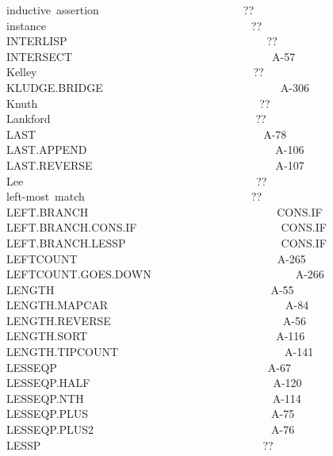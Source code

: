 \documentclass[11pt]{book}
\newenvironment{pubasis}{\begin{flushleft}\ttfamily\small}{\normalsize\rmfamily\end{flushleft}}
\begin{document}
\begin{pubasis}
inductive~assertion~~~~~~~~~~~~~~~~~~~~~~~~~~??\\
instance~~~~~~~~~~~~~~~~~~~~~~~~~~~~~~~~~~~~~??\\
INTERLISP~~~~~~~~~~~~~~~~~~~~~~~~~~~~~~~~~~~~??\\
INTERSECT~~~~~~~~~~~~~~~~~~~~~~~~~~~~~~~~~~~~A-57\\
Kelley~~~~~~~~~~~~~~~~~~~~~~~~~~~~~~~~~~~~~~~??\\
KLUDGE.BRIDGE~~~~~~~~~~~~~~~~~~~~~~~~~~~~~~~~A-306\\
Knuth~~~~~~~~~~~~~~~~~~~~~~~~~~~~~~~~~~~~~~~~??\\
Lankford~~~~~~~~~~~~~~~~~~~~~~~~~~~~~~~~~~~~~??\\
LAST~~~~~~~~~~~~~~~~~~~~~~~~~~~~~~~~~~~~~~~~~A-78\\
LAST.APPEND~~~~~~~~~~~~~~~~~~~~~~~~~~~~~~~~~~A-106\\
LAST.REVERSE~~~~~~~~~~~~~~~~~~~~~~~~~~~~~~~~~A-107\\
Lee~~~~~~~~~~~~~~~~~~~~~~~~~~~~~~~~~~~~~~~~~~??\\
left-most~match~~~~~~~~~~~~~~~~~~~~~~~~~~~~~~??\\
LEFT.BRANCH~~~~~~~~~~~~~~~~~~~~~~~~~~~~~~~~~~CONS.IF\\
LEFT.BRANCH.CONS.IF~~~~~~~~~~~~~~~~~~~~~~~~~~CONS.IF\\
LEFT.BRANCH.LESSP~~~~~~~~~~~~~~~~~~~~~~~~~~~~CONS.IF\\
LEFTCOUNT~~~~~~~~~~~~~~~~~~~~~~~~~~~~~~~~~~~~A-265\\
LEFT\-COUNT.GOES.DOWN~~~~~~~~~~~~~~~~~~~~~~~~~~A-266\\
LENGTH~~~~~~~~~~~~~~~~~~~~~~~~~~~~~~~~~~~~~~~A-55\\
LENGTH.MAPCAR~~~~~~~~~~~~~~~~~~~~~~~~~~~~~~~~A-84\\
LENGTH.REVERSE~~~~~~~~~~~~~~~~~~~~~~~~~~~~~~~A-56\\
LENGTH.SORT~~~~~~~~~~~~~~~~~~~~~~~~~~~~~~~~~~A-116\\
LENGTH.TIPCOUNT~~~~~~~~~~~~~~~~~~~~~~~~~~~~~~A-141\\
LESSEQP~~~~~~~~~~~~~~~~~~~~~~~~~~~~~~~~~~~~~~A-67\\
LESSEQP.HALF~~~~~~~~~~~~~~~~~~~~~~~~~~~~~~~~~A-120\\
LESSEQP.NTH~~~~~~~~~~~~~~~~~~~~~~~~~~~~~~~~~~A-114\\
LESSEQP.PLUS~~~~~~~~~~~~~~~~~~~~~~~~~~~~~~~~~A-75\\
LESSEQP.PLUS2~~~~~~~~~~~~~~~~~~~~~~~~~~~~~~~~A-76\\
LESSP~~~~~~~~~~~~~~~~~~~~~~~~~~~~~~~~~~~~~~~~??\\

\end{pubasis}
\end{document}

